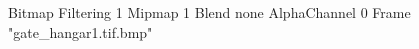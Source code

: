 {Bitmap
	{Filtering 1}
	{Mipmap 1}
	{Blend none}
	{AlphaChannel 0}
	{Frame "gate_hangar1.tif.bmp"}
}
